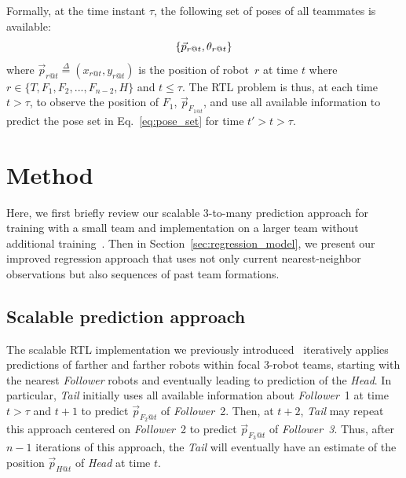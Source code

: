 \documentclass[letterpaper, 10 pt, conference]{ieeeconf}  %
\begin{document}
    Formally, at the time instant $\tau$, the following set of poses of
    all teammates is available:
	\begin{equation}
		\{\vec{p}_{r@t},\theta_{r@t}\} \\
	    \label{eq:pose_set}
	\end{equation}
    where $\vec{p}_{r@t} \overset{\Delta}{=}(x_{r@t}, y_{r@t})$ is the
    position of robot~$r$ at time $t$ where  $r \in \{T, F_{1}, F_{2},
    ..., F_{n-2}, H\}$ and $t \leq \tau$. The RTL problem is thus, at
    each time $t > \tau$, to observe the position of $F_1$,
    $\vec{p}_{F_{1@t}}$, and use all available information to predict
    the pose set in Eq.~\eqref{eq:pose_set} for time $t' > t > \tau$.


	\section{Method}
	\label{sec:method}

    Here, we first briefly review our scalable 3-to-many prediction
    approach for training with a small team and implementation on a
    larger team without additional training~\cite{CPR17}. Then in
    Section~\ref{sec:regression_model}, we present our improved
    regression approach that uses not only current nearest-neighbor
    observations but also sequences of past team formations.

	\subsection{Scalable prediction approach}
	\label{sec:scalable_prediction}

    The scalable RTL implementation we previously
    introduced~\cite{CPR17} iteratively applies predictions of farther
    and farther robots within focal 3-robot teams, starting with the
    nearest \emph{Follower} robots and eventually leading to prediction
    of the \emph{Head}. In particular, \emph{Tail} initially uses all
    available information about \emph{Follower}~1 at time $t > \tau$ and
    $t+1$ to predict $\vec{p}_{F_2@t}$ of \emph{Follower}~2. Then,
    at $t+2$, \emph{Tail} may repeat this approach centered on
    \emph{Follower}~2 to predict $\vec{p}_{F_3@t}$ of
    \emph{Follower~3}. Thus, after $n-1$ iterations of this approach,
    the \emph{Tail} will eventually have an estimate of the position
    $\vec{p}_{H@t}$ of \emph{Head} at time $t$.
\end{document}

